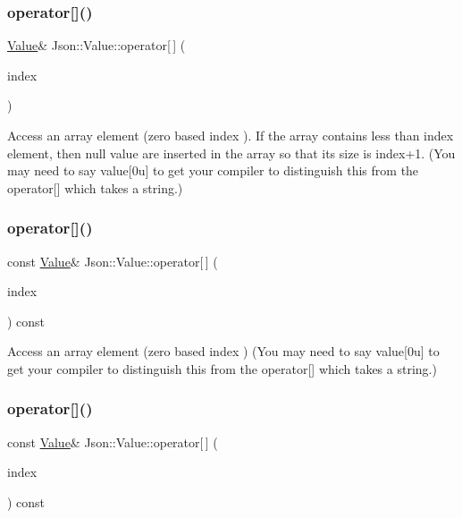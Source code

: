 \subsubsection{\texorpdfstring{operator[]()}{operator[]()}\hspace{0.1cm}{\footnotesize\ttfamily [2/7]}}
{\footnotesize\ttfamily \mbox{\hyperlink{class_json_1_1_value}{Value}}\& Json\+::\+Value\+::operator\mbox{[}$\,$\mbox{]} (\begin{DoxyParamCaption}\item[{int}]{index }\end{DoxyParamCaption})}

Access an array element (zero based index ). If the array contains less than index element, then null value are inserted in the array so that its size is index+1. (You may need to say \textquotesingle{}value\mbox{[}0u\mbox{]}\textquotesingle{} to get your compiler to distinguish this from the operator\mbox{[}\mbox{]} which takes a string.) \mbox{\label{class_json_1_1_value_a3b1aece4ef292926e2bdb42fed925508}} 
\subsubsection{\texorpdfstring{operator[]()}{operator[]()}\hspace{0.1cm}{\footnotesize\ttfamily [3/7]}}
{\footnotesize\ttfamily const \mbox{\hyperlink{class_json_1_1_value}{Value}}\& Json\+::\+Value\+::operator\mbox{[}$\,$\mbox{]} (\begin{DoxyParamCaption}\item[{Array\+Index}]{index }\end{DoxyParamCaption}) const}

Access an array element (zero based index ) (You may need to say \textquotesingle{}value\mbox{[}0u\mbox{]}\textquotesingle{} to get your compiler to distinguish this from the operator\mbox{[}\mbox{]} which takes a string.) \mbox{\label{class_json_1_1_value_a1a081ad448db7a14ef87e79ef28762d2}} 
\subsubsection{\texorpdfstring{operator[]()}{operator[]()}\hspace{0.1cm}{\footnotesize\ttfamily [4/7]}}
{\footnotesize\ttfamily const \mbox{\hyperlink{class_json_1_1_value}{Value}}\& Json\+::\+Value\+::operator\mbox{[}$\,$\mbox{]} (\begin{DoxyParamCaption}\item[{int}]{index }\end{DoxyParamCaption}) const}

